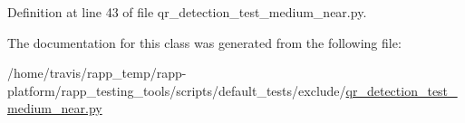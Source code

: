 Definition at line 43 of file qr\-\_\-detection\-\_\-test\-\_\-medium\-\_\-near.\-py.



The documentation for this class was generated from the following file\-:\begin{DoxyCompactItemize}
\item 
/home/travis/rapp\-\_\-temp/rapp-\/platform/rapp\-\_\-testing\-\_\-tools/scripts/default\-\_\-tests/exclude/\hyperlink{qr__detection__test__medium__near_8py}{qr\-\_\-detection\-\_\-test\-\_\-medium\-\_\-near.\-py}\end{DoxyCompactItemize}
